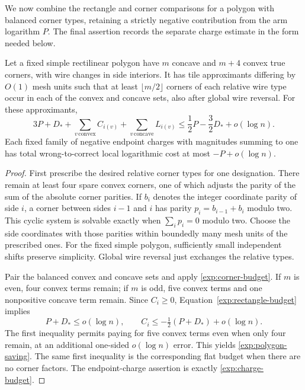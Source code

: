 We now combine the rectangle and corner comparisons for a polygon with
balanced corner types, retaining a strictly negative contribution from
the arm logarithm $P$.  The final assertion records the separate charge
estimate in the form needed below.

\begin{corollary}\label{exp:polygon-budget}
Let a fixed simple rectilinear polygon have $m$ concave and $m+4$
convex true corners, with wire changes in side interiors. It has tile
approximants differing by $O(1)$ mesh units such that at least
$\lfloor m/2\rfloor$ corners of each relative wire type occur in each
of the convex and concave sets, also after global wire reversal.
For these approximants,
\begin{equation}\label{exp:polygon-saving}
 3P+D_*+\sum_{v\,\mathrm{convex}}C_{i(v)}
       +\sum_{v\,\mathrm{concave}}L_{i(v)}
 \le\frac12P-\frac32D_*+o(\log n).
\end{equation}
Each fixed family of negative endpoint charges with magnitudes summing
to one has total wrong-to-correct local logarithmic cost at most
$-P+o(\log n)$.
\end{corollary}

\begin{proof}
First prescribe the desired relative corner types for one designation.
There remain at least four spare convex corners, one of which adjusts
the parity of the sum of the absolute corner parities. If $b_i$ denotes
the integer coordinate parity of side $i$, a corner between sides
$i-1$ and $i$ has parity $p_i=b_{i-1}+b_i$ modulo two. This cyclic
system is solvable exactly when $\sum_i p_i=0$ modulo two. Choose the
side coordinates with those parities within boundedly many mesh units
of the prescribed ones. For the fixed simple polygon, sufficiently
small independent shifts preserve simplicity. Global wire reversal
just exchanges the relative types.

Pair the balanced convex and concave sets and apply
\eqref{exp:corner-budget}. If $m$ is even, four convex terms remain;
if $m$ is odd, five convex terms and one nonpositive concave term remain.
Since $C_i\ge0$, Equation~\eqref{exp:rectangle-budget} implies
\[
 P+D_*\le o(\log n),\qquad
 C_i\le-\tfrac12(P+D_*)+o(\log n).
\]
The first inequality permits paying for five convex terms even when
only four remain, at an additional one-sided $o(\log n)$ error.
This yields \eqref{exp:polygon-saving}. The same first inequality is
the corresponding flat budget when there are no corner factors.
The endpoint-charge assertion is exactly
\eqref{exp:charge-budget}.
\end{proof}
